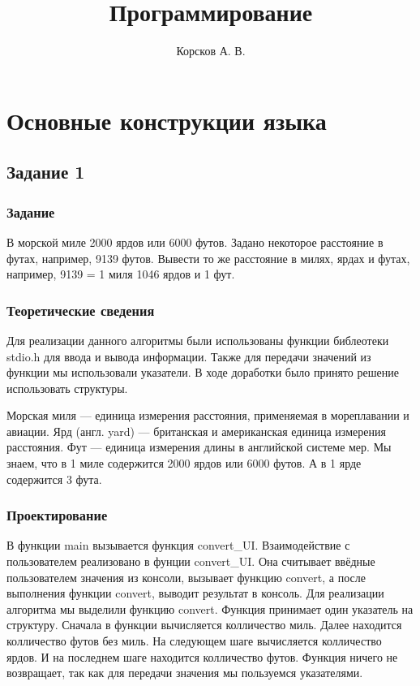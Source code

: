 \documentclass[12pt,a4paper]{report}
\author{Корсков А. В.}
\title{Программирование}
\begin{document}
\maketitle
\chapter{Основные конструкции языка}
\section{Задание 1}
\subsection{Задание}
В морской миле 2000 ярдов или 6000 футов. Задано некоторое расстояние в футах, например, 9139 футов. Вывести то же расстояние в милях, ярдах и футах, например, 9139 = 1 миля 1046 ярдов и 1 фут.
\subsection{Теоретические сведения}
Для реализации данного алгоритмы были использованы функции библеотеки stdio.h для ввода и вывода информации. Также для передачи значений из функции мы использовали указатели. В ходе доработки было принято решение использовать структуры.

Морская миля — единица измерения расстояния, применяемая в мореплавании и авиации. Ярд (англ. yard) — британская и американская единица измерения расстояния. Фут — единица измерения длины в английской системе мер. Мы знаем, что в 1 миле содержится 2000 ярдов или 6000 футов. А в 1 ярде содержится 3 фута.
\subsection{Проектирование}
В функции main вызывается функция convert\_UI. Взаимодействие с пользователем реализовано в фунции convert\_UI. Она считывает ввёдные пользователем значения из консоли, вызывает функцию convert, а после выполнения функции convert, выводит результат в консоль. Для реализации алгоритма мы выделили функцию convert. Функция принимает один указатель на структуру. Сначала в функции вычисляется колличество миль. Далее находится колличество футов без миль. На следующем шаге вычисляется колличество ярдов. И на последнем шаге находится колличество футов. Функция ничего не возвращает, так как для передачи значения мы пользуемся указателями.
\end{document}
